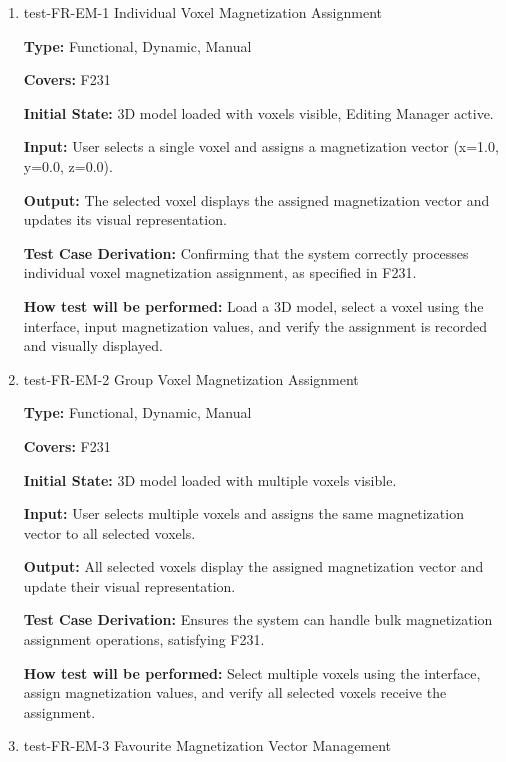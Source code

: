 \documentclass[12pt, titlepage]{article}
\begin{document}
\begin{enumerate}

\item{test-FR-EM-1 Individual Voxel Magnetization Assignment\\}
\label{sec:t-em-1}

\textbf{Type:} Functional, Dynamic, Manual

\textbf{Covers:} F231
					
\textbf{Initial State:} 3D model loaded with voxels visible, Editing Manager active.
					
\textbf{Input:} User selects a single voxel and assigns a magnetization vector (x=1.0, y=0.0, z=0.0).
					
\textbf{Output:} The selected voxel displays the assigned magnetization vector and updates its visual representation.

\textbf{Test Case Derivation:} Confirming that the system correctly processes individual voxel magnetization assignment, as specified in F231.
					
\textbf{How test will be performed:} Load a 3D model, select a voxel using the interface, input magnetization values, and verify the assignment is recorded and visually displayed.

\item{test-FR-EM-2 Group Voxel Magnetization Assignment\\}
\label{sec:t-em-2}

\textbf{Type:} Functional, Dynamic, Manual

\textbf{Covers:} F231
					
\textbf{Initial State:} 3D model loaded with multiple voxels visible.
					
\textbf{Input:} User selects multiple voxels and assigns the same magnetization vector to all selected voxels.
					
\textbf{Output:} All selected voxels display the assigned magnetization vector and update their visual representation.

\textbf{Test Case Derivation:} Ensures the system can handle bulk magnetization assignment operations, satisfying F231.
					
\textbf{How test will be performed:} Select multiple voxels using the interface, assign magnetization values, and verify all selected voxels receive the assignment.

\item{test-FR-EM-3 Favourite Magnetization Vector Management\\}
\label{sec:t-em-3}


\end{enumerate}
\end{document}
